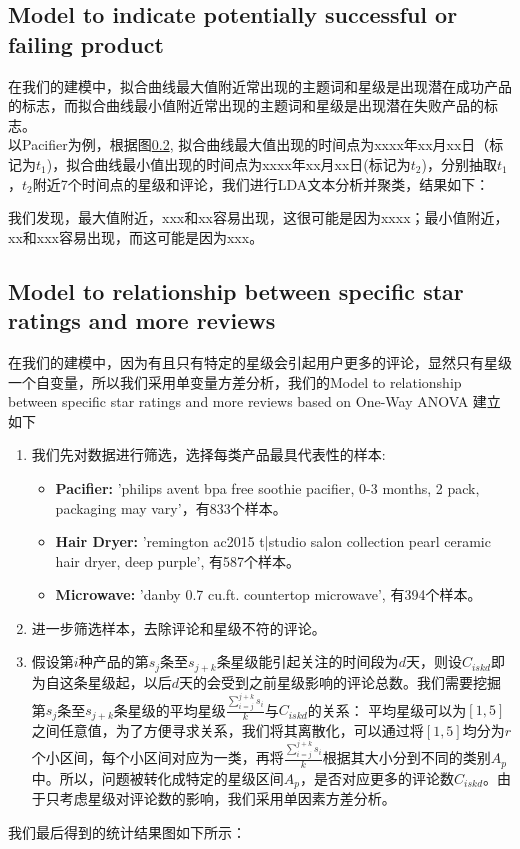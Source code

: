 \documentclass{mcmthesis}
\begin{document}
\subsection{Model to indicate potentially successful or failing product}
在我们的建模中，拟合曲线最大值附近常出现的主题词和星级是出现潜在成功产品的标志，而拟合曲线最小值附近常出现的主题词和星级是出现潜在失败产品的标志。\\

以Pacifier为例，根据图\ref{}, 拟合曲线最大值出现的时间点为xxxx年xx月xx日（标记为$t_{1}$)，拟合曲线最小值出现的时间点为xxxx年xx月xx日(标记为$t_{2}$)，分别抽取$t_{1}$，$t_{2}$附近7个时间点的星级和评论，我们进行LDA文本分析并聚类，结果如下：

我们发现，最大值附近，xxx和xx容易出现，这很可能是因为xxxx；最小值附近，xx和xxx容易出现，而这可能是因为xxx。


\subsection{Model to relationship between specific star ratings and more reviews}
在我们的建模中，因为有且只有特定的星级会引起用户更多的评论，显然只有星级一个自变量，所以我们采用单变量方差分析，我们的Model to relationship between specific star ratings and more reviews based on One-Way ANOVA 建立如下\\
\begin{enumerate}
	\item 我们先对数据进行筛选，选择每类产品最具代表性的样本:
	\begin{itemize}
		\item \textbf{Pacifier: }'philips avent bpa free soothie pacifier, 0-3 months, 2 pack, packaging may vary'，有833个样本。
		\item \textbf{Hair Dryer: }'remington ac2015 t|studio salon collection pearl ceramic hair dryer, deep purple', 有587个样本。
		\item \textbf{Microwave: }'danby 0.7 cu.ft. countertop microwave', 有394个样本。
	\end{itemize}
	\item 进一步筛选样本，去除评论和星级不符的评论。
	\item 假设第$i$种产品的第$s_j$条至$s_{j+k}$条星级能引起关注的时间段为$d$天，则设$C_{iskd}$即为自这条星级起，以后$d$天的会受到之前星级影响的评论总数。我们需要挖掘第$s_j$条至$s_{j+k}$条星级的平均星级$\frac{\sum_{i=j}^{j+k}s_i}{k}$与$C_{iskd}$的关系：
	平均星级可以为$[1,5]$之间任意值，为了方便寻求关系，我们将其离散化，可以通过将$[1,5]$均分为$r$个小区间，每个小区间对应为一类，再将$\frac{\sum_{i=j}^{j+k}s_i}{k}$根据其大小分到不同的类别$A_p$中。所以，问题被转化成特定的星级区间$A_p$，是否对应更多的评论数$C_{iskd}$。由于只考虑星级对评论数的影响，我们采用单因素方差分析。
\end{enumerate}
我们最后得到的统计结果图如下所示：\\
\end{document}

